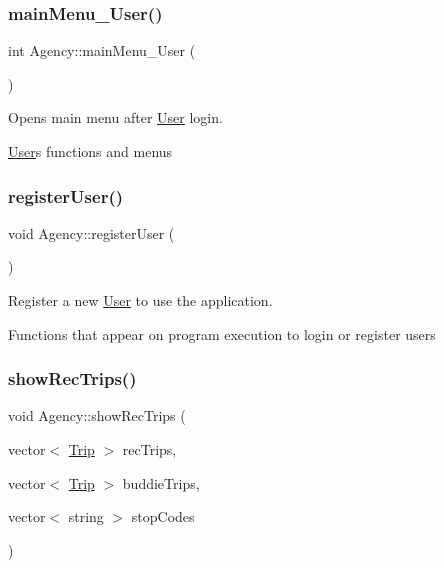 \subsubsection{\texorpdfstring{main\+Menu\+\_\+\+User()}{mainMenu\_User()}}
{\footnotesize\ttfamily int Agency\+::main\+Menu\+\_\+\+User (\begin{DoxyParamCaption}{ }\end{DoxyParamCaption})}



Opens main menu after \hyperlink{class_user}{User} login. 

\hyperlink{class_user}{User}\textquotesingle{}s functions and menus \mbox{\label{group___agency_ga75a16a58bcbc705df50e89531f513c49}} 
\subsubsection{\texorpdfstring{register\+User()}{registerUser()}}
{\footnotesize\ttfamily void Agency\+::register\+User (\begin{DoxyParamCaption}{ }\end{DoxyParamCaption})}



Register a new \hyperlink{class_user}{User} to use the application. 

Functions that appear on program execution to login or register users \mbox{\label{group___agency_gabc352c6cad4e22817e2a52a0e756e295}} 
\subsubsection{\texorpdfstring{show\+Rec\+Trips()}{showRecTrips()}}
{\footnotesize\ttfamily void Agency\+::show\+Rec\+Trips (\begin{DoxyParamCaption}\item[{vector$<$ \hyperlink{class_trip}{Trip} $>$}]{rec\+Trips,  }\item[{vector$<$ \hyperlink{class_trip}{Trip} $>$}]{buddie\+Trips,  }\item[{vector$<$ string $>$}]{stop\+Codes }\end{DoxyParamCaption})}




